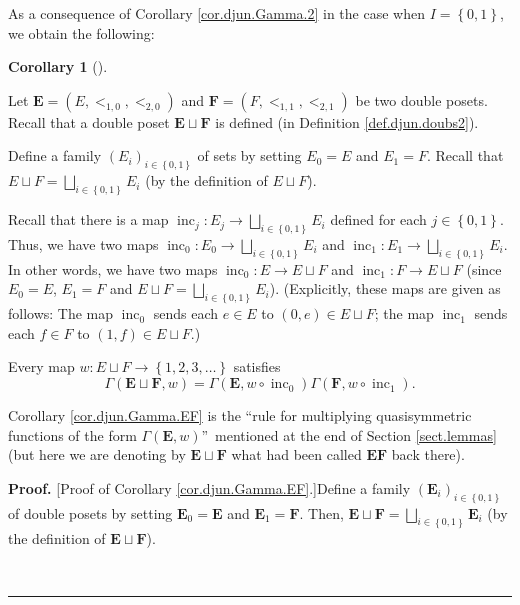 \documentclass[numbers=enddot,12pt,final,onecolumn,notitlepage,abstracton]{scrartcl}
\theoremstyle{definition}
\newtheorem{coro}[theo]{Corollary}
\newenvironment{corollary}[1][]
{\begin{coro}[#1]\begin{leftbar}}
{\end{leftbar}\end{coro}}
\newenvironment{proof}[1][Proof]{\noindent\textbf{#1.} }{\ \rule{0.5em}{0.5em}}
\newenvironment{verlong}{}{}
\begin{document}
\begin{verlong}
\begin{footnotesize}
As a consequence of Corollary \ref{cor.djun.Gamma.2} in the case when
$I=\left\{  0,1\right\}  $, we obtain the following:

\begin{corollary}
\label{cor.djun.Gamma.EF}Let $\mathbf{E}=\left(  E,<_{1,0},<_{2,0}\right)  $
and $\mathbf{F}=\left(  F,<_{1,1},<_{2,1}\right)  $ be two double posets.
Recall that a double poset $\mathbf{E}\sqcup\mathbf{F}$ is defined (in
Definition \ref{def.djun.doubs2}).

Define a family $\left(  E_{i}\right)  _{i\in\left\{  0,1\right\}  }$ of sets
by setting $E_{0}=E$ and $E_{1}=F$. Recall that $E\sqcup F=\bigsqcup
_{i\in\left\{  0,1\right\}  }E_{i}$ (by the definition of $E\sqcup F$).

Recall that there is a map $\operatorname*{inc}\nolimits_{j}:E_{j}%
\rightarrow\bigsqcup_{i\in\left\{  0,1\right\}  }E_{i}$ defined for each
$j\in\left\{  0,1\right\}  $. Thus, we have two maps $\operatorname*{inc}%
\nolimits_{0}:E_{0}\rightarrow\bigsqcup_{i\in\left\{  0,1\right\}  }E_{i}$ and
$\operatorname*{inc}\nolimits_{1}:E_{1}\rightarrow\bigsqcup_{i\in\left\{
0,1\right\}  }E_{i}$. In other words, we have two maps $\operatorname*{inc}%
\nolimits_{0}:E\rightarrow E\sqcup F$ and $\operatorname*{inc}\nolimits_{1}%
:F\rightarrow E\sqcup F$ (since $E_{0}=E$, $E_{1}=F$ and $E\sqcup
F=\bigsqcup_{i\in\left\{  0,1\right\}  }E_{i}$). (Explicitly, these maps are
given as follows: The map $\operatorname*{inc}\nolimits_{0}$ sends each $e\in
E$ to $\left(  0,e\right)  \in E\sqcup F$; the map $\operatorname*{inc}%
\nolimits_{1}$ sends each $f\in F$ to $\left(  1,f\right)  \in E\sqcup F$.)

Every map $w:E\sqcup F\rightarrow\left\{  1,2,3,\ldots\right\}  $ satisfies%
\[
\Gamma\left(  \mathbf{E}\sqcup\mathbf{F},w\right)  =\Gamma\left(
\mathbf{E},w\circ\operatorname*{inc}\nolimits_{0}\right)  \Gamma\left(
\mathbf{F},w\circ\operatorname*{inc}\nolimits_{1}\right)  .
\]

\end{corollary}

Corollary \ref{cor.djun.Gamma.EF} is the \textquotedblleft rule for
multiplying quasisymmetric functions of the form $\Gamma\left(  {\mathbf{E}%
},w\right)  $\textquotedblright\ mentioned at the end of Section
\ref{sect.lemmas} (but here we are denoting by $\mathbf{E}\sqcup\mathbf{F}$
what had been called $\mathbf{EF}$ back there).

\begin{proof}
[Proof of Corollary \ref{cor.djun.Gamma.EF}.]Define a family $\left(
\mathbf{E}_{i}\right)  _{i\in\left\{  0,1\right\}  }$ of double posets by
setting $\mathbf{E}_{0}=\mathbf{E}$ and $\mathbf{E}_{1}=\mathbf{F}$. Then,
$\mathbf{E}\sqcup\mathbf{F}=\bigsqcup_{i\in\left\{  0,1\right\}  }%
\mathbf{E}_{i}$ (by the definition of $\mathbf{E}\sqcup\mathbf{F}$).


\end{proof}
\end{footnotesize}
\end{verlong}
\end{document}
